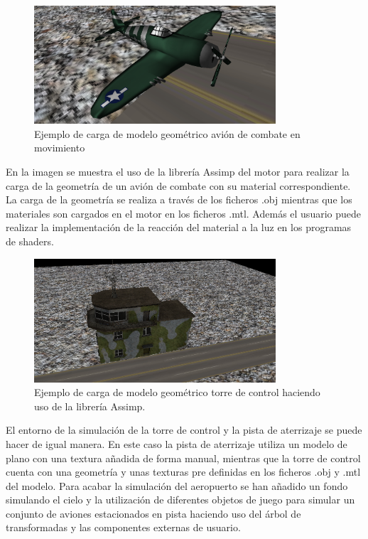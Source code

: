 \documentclass[a4paper]{book}
\begin{document}
\begin{figure}[H]
    \centering
    \includegraphics[width=9cm, keepaspectratio]{img/Airplane.png}
    \caption{Ejemplo de carga de modelo geométrico avión de combate en movimiento}
    \label{Airplane}
\end{figure}

En la imagen se muestra el uso de la librería Assimp del motor para realizar la carga de la geometría de un avión de combate con su
material correspondiente. La carga de la geometría se realiza a través de los ficheros .obj mientras que los materiales son cargados
en el motor en los ficheros .mtl. Además el usuario puede realizar la implementación de la reacción del material a la luz en los programas
de shaders.

\begin{figure}[H]
    \centering
    \includegraphics[width=9cm, keepaspectratio]{img/Tower.png}
    \caption{Ejemplo de carga de modelo geométrico torre de control haciendo uso de la librería Assimp.}
    \label{Tower}
\end{figure}

El entorno de la simulación de la torre de control y la pista de aterrizaje se puede hacer de igual manera. En este caso la pista de aterrizaje
utiliza un modelo de plano con una textura añadida de forma manual, mientras que la torre de control cuenta con una geometría y unas texturas
pre definidas en los ficheros .obj y .mtl del modelo. Para acabar la simulación del aeropuerto se han añadido un fondo simulando el cielo y
la utilización de diferentes objetos de juego para simular un conjunto de aviones estacionados en pista haciendo uso del árbol de transformadas
y las componentes externas de usuario.
\end{document}
